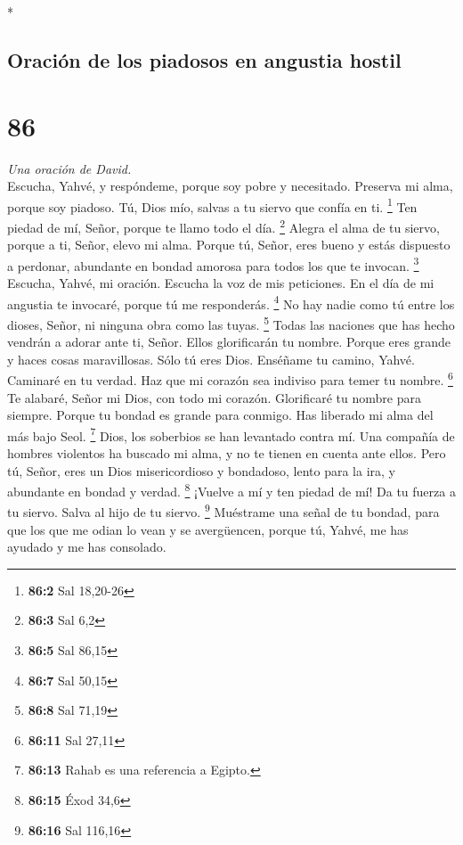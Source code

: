 \begin{paracol}{2}
\begin{otherlanguage}{english}
\end{otherlanguage}

\switchcolumn[0]*

\hypertarget{oraciuxf3n-de-los-piadosos-en-angustia-hostil}{%
\subsection{Oración de los piadosos en angustia
hostil}\label{oraciuxf3n-de-los-piadosos-en-angustia-hostil}}

\hypertarget{section-170}{%
\section{86}\label{section-170}}

\emph{Una oración de David.}\\
 Escucha, Yahvé, y respóndeme, porque soy pobre y
necesitado.  Preserva mi alma, porque soy piadoso. Tú,
Dios mío, salvas a tu siervo que confía en ti. \footnote{\textbf{86:2}
  Sal 18,20-26}  Ten piedad de mí, Señor, porque te llamo
todo el día. \footnote{\textbf{86:3} Sal 6,2}  Alegra el
alma de tu siervo, porque a ti, Señor, elevo mi alma. 
Porque tú, Señor, eres bueno y estás dispuesto a perdonar, abundante en
bondad amorosa para todos los que te invocan. \footnote{\textbf{86:5}
  Sal 86,15}  Escucha, Yahvé, mi oración. Escucha la voz
de mis peticiones.  En el día de mi angustia te invocaré,
porque tú me responderás. \footnote{\textbf{86:7} Sal 50,15}
 No hay nadie como tú entre los dioses, Señor, ni ninguna
obra como las tuyas. \footnote{\textbf{86:8} Sal 71,19} 
Todas las naciones que has hecho vendrán a adorar ante ti, Señor. Ellos
glorificarán tu nombre.  Porque eres grande y haces cosas
maravillosas. Sólo tú eres Dios.  Enséñame tu camino,
Yahvé. Caminaré en tu verdad. Haz que mi corazón sea indiviso para temer
tu nombre. \footnote{\textbf{86:11} Sal 27,11}  Te
alabaré, Señor mi Dios, con todo mi corazón. Glorificaré tu nombre para
siempre.  Porque tu bondad es grande para conmigo. Has
liberado mi alma del más bajo Seol. \footnote{\textbf{86:13} Rahab es
  una referencia a Egipto.}  Dios, los soberbios se han
levantado contra mí. Una compañía de hombres violentos ha buscado mi
alma, y no te tienen en cuenta ante ellos.  Pero tú,
Señor, eres un Dios misericordioso y bondadoso, lento para la ira, y
abundante en bondad y verdad. \footnote{\textbf{86:15} Éxod 34,6}
 ¡Vuelve a mí y ten piedad de mí! Da tu fuerza a tu
siervo. Salva al hijo de tu siervo. \footnote{\textbf{86:16} Sal 116,16}
 Muéstrame una señal de tu bondad, para que los que me
odian lo vean y se avergüencen, porque tú, Yahvé, me has ayudado y me
has consolado.


\end{paracol}
